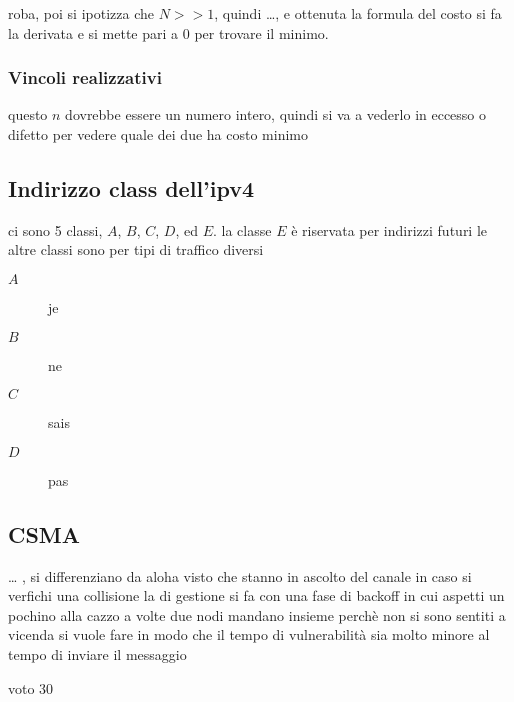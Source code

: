 \documentclass[11pt]{article}
\begin{document}
roba, poi si ipotizza che \(N >> 1\), quindi \ldots{}, e ottenuta la formula del costo si fa la derivata e si mette pari a 0 per trovare il minimo.

\subsubsection{Vincoli realizzativi}
\label{sec:org7f1133b}
questo \(n\) dovrebbe essere un numero intero, quindi si va a vederlo in eccesso o difetto per vedere quale dei due ha costo minimo

\subsection{Indirizzo class dell'ipv4}
\label{sec:org11d2f35}
ci sono 5 classi, \(A\), \(B\), \(C\), \(D\), ed \(E\).
la classe \(E\) è riservata per indirizzi futuri
le altre classi sono per tipi di traffico diversi
\begin{description}
\item[{\(A\)}] je
\item[{\(B\)}] ne
\item[{\(C\)}] sais
\item[{\(D\)}] pas
\end{description}

\subsection{CSMA}
\label{sec:orgae03096}
\ldots{} , si differenziano da aloha visto che stanno in ascolto del canale
in caso si verfichi una collisione la di gestione si fa con una fase di backoff in cui aspetti un pochino alla cazzo
a volte due nodi mandano insieme perchè non si sono sentiti a vicenda
si vuole fare in modo che il tempo di vulnerabilità sia molto minore al tempo di inviare il messaggio

voto 30
\end{document}
